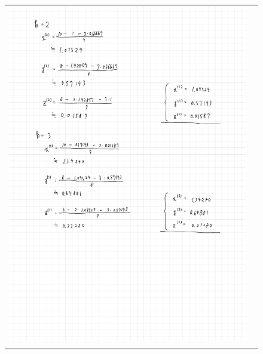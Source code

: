 \documentclass[a4paper, titlepage]{jsarticle}
\begin{document}
\begin{figure}[ht]
\begin{tabular}{cc}
\begin{minipage}[t]{8.2cm}
						\includegraphics[keepaspectratio, scale=0.4]{Jacobi_2.pdf}
					\end{minipage} \\
					\begin{minipage}[t]{8.2cm}
						\centering

\end{minipage}
\end{tabular}
\end{figure}
\end{document}
